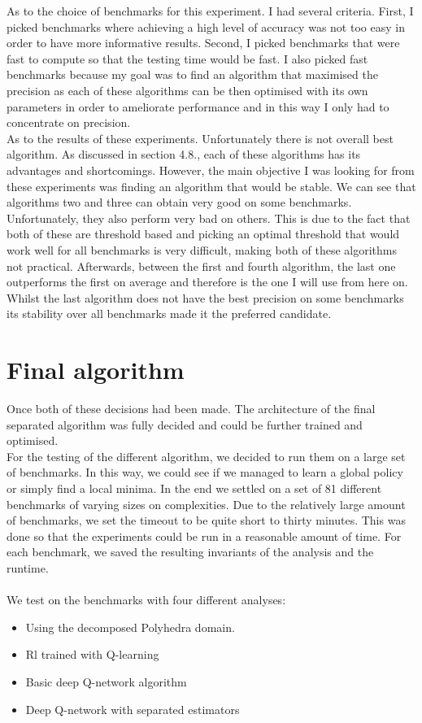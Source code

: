 As to the choice of benchmarks for this experiment. I had several criteria. First, I picked benchmarks where achieving a high level of accuracy was not too easy in order to have more informative results. Second, I picked benchmarks that were fast to compute so that the testing time would be fast. I also picked fast benchmarks because my goal was to find an algorithm that maximised the precision as each of these algorithms can be then optimised with its own parameters in order to ameliorate performance and in this way I only had to concentrate on precision.\\
As to the results of these experiments. Unfortunately there is not overall best algorithm. As discussed in section 4.8., each of these algorithms has its advantages and shortcomings. However, the main objective I was looking for from these experiments was finding an algorithm that would be stable. We can see that algorithms two and three can obtain very good on some benchmarks. Unfortunately, they also perform very bad on others. This is due to the fact that both of these are threshold based and picking an optimal threshold that would work well for all benchmarks is very difficult, making both of these algorithms not practical. Afterwards, between the first and fourth algorithm, the last one outperforms the first on average and therefore is the one I will use from here on. Whilst the last algorithm does not have the best precision on some benchmarks its stability over all benchmarks made it the preferred candidate.


\section{Final algorithm}
Once both of these decisions had been made. The architecture of the final separated algorithm was fully decided and could be further trained and optimised.\\
For the testing of the different algorithm, we decided to run them on a large set of benchmarks. In this way, we could see if we managed to learn a global policy or simply find a local minima. In the end we settled on a set of 81 different benchmarks of varying sizes on complexities. Due to the relatively large amount of benchmarks, we set the timeout to be quite short to thirty minutes. This was done so that the experiments could be run in a reasonable amount of time. For each benchmark, we saved the resulting invariants of the analysis and the runtime.\\
\mbox{}\\
We test on the benchmarks with four different analyses:
\begin{itemize}
	\item Using the decomposed Polyhedra domain.
	\item Rl trained with Q-learning
	\item Basic deep Q-network algorithm
	\item Deep Q-network with separated estimators
\end{itemize}

